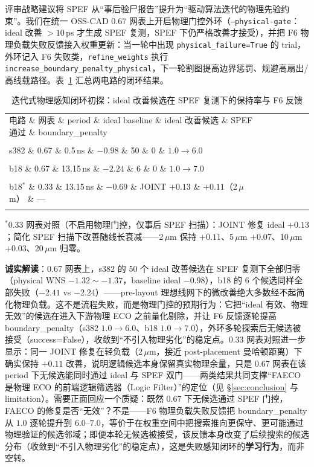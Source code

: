 \documentclass[journal]{IEEEtran}
\begin{document}
评审战略建议将 SPEF 从“事后验尸报告”提升为“驱动算法迭代的物理先验约束”。我们在统一 OSS-CAD 0.67 网表上开启物理门控外环（\texttt{--physical-gate}：ideal 改善 $>10\,$ps 才生成 SPEF 复测，SPEF 下仍严格改善才接受），并把 F6 物理负载失败反馈接入权重更新：当一轮中出现 \texttt{physical\_failure=True} 的 trial，外环记入 F6 失败类，\texttt{refine\_weights} 执行 \texttt{increase\_boundary\_penalty\_physical}，下一轮割图提高边界惩罚、规避高扇出/高线载路径。表~\ref{tab:phys_closure} 汇总两电路的闭环结果。

\begin{table}[!t]
\centering
\caption{迭代式物理感知闭环初探：ideal 改善候选在 SPEF 复测下的保持率与 F6 反馈}
\label{tab:phys_closure}
\scriptsize
\setlength{\tabcolsep}{3pt}
\begin{tabular}{lclcccl}
\toprule
电路 \& 网表 \& period \& ideal baseline \& ideal 改善候选 \& SPEF 通过 \& boundary\_penalty \\\\
\midrule
s382 \& 0.67 \& 0.5\,ns \& $-0.98$ \& 50 \& 0 \& $1.0\to6.0$ \\\\
b18 \& 0.67 \& 13.15\,ns \& $-2.24$ \& 6 \& 0 \& $1.0\to7.0$ \\\\
b18$^{\ast}$ \& 0.33 \& 13.15\,ns \& $-0.69$ \& JOINT $+0.13$ \& $+0.11$（2\,$\mu$m） \& --- \\\\
\bottomrule
\end{tabular}

\scriptsize
$^{\ast}$0.33 网表对照（不启用物理门控，仅事后 SPEF 扫描）：JOINT 修复 ideal $+0.13$；简化 SPEF 扫描下改善随线长衰减——2\,$\mu$m 保持 $+0.11$、5\,$\mu$m $+0.07$、10\,$\mu$m $+0.03$、20\,$\mu$m 归零。
\end{table}

\textbf{诚实解读}：0.67 网表上，s382 的 50 个 ideal 改善候选在 SPEF 复测下全部归零（physical WNS $-1.32\sim-1.37$，baseline ideal $-0.98$），b18 的 6 个候选同样全部失败（$-2.41$ vs $-2.24$）——pre-layout 理想线网下的微改善绝大多数经不起简化物理负载。这不是流程失败，而是物理门控的预期行为：它把“ideal 有效、物理无效”的候选在进入下游物理 ECO 之前量化剔除，并让 F6 反馈逐轮提高 boundary\_penalty（s382 $1.0\to6.0$、b18 $1.0\to7.0$），外环多轮探索后无候选被接受（success=False），收敛到“不引入物理劣化”的稳定点。0.33 网表对照进一步显示：同一 JOINT 修复在轻负载（2\,$\mu$m，接近 post-placement 曼哈顿距离）下确实保持 $+0.11$ 改善，说明逻辑候选本身保留真实物理余量，只是 0.67 网表在该 period 下无候选能同时通过 ideal 与 SPEF 双门——两类结果共同支撑“FAECO 是物理 ECO 的前端逻辑筛选器（Logic Filter）”的定位（见 \S\ref{sec:conclusion} 与 limitation）。需要正面回应一个质疑：既然 0.67 下无候选通过 SPEF 门控，FAECO 的修复是否“无效”？不是——F6 物理负载失败反馈把 boundary\_penalty 从 $1.0$ 逐轮提升到 $6.0$--$7.0$，等价于在权重空间中把搜索推向更保守、更可能通过物理验证的候选邻域；即便本轮无候选被接受，该反馈本身改变了后续搜索的候选分布（收敛到“不引入物理劣化”的稳定点），这是失败感知闭环的\textbf{学习行为}，而非空转。
\end{document}
